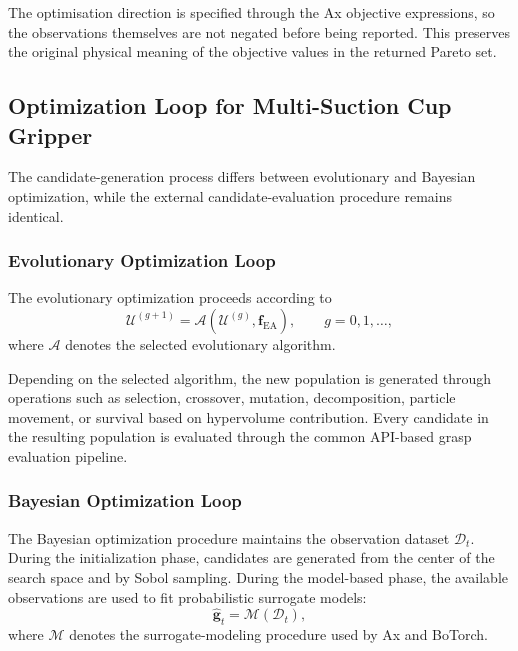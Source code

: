 The optimisation direction is specified through the Ax objective expressions, so the
observations themselves are not negated before being reported. This preserves the original
physical meaning of the objective values in the returned Pareto set.


\subsection{Optimization Loop for Multi-Suction Cup Gripper}

The candidate-generation process differs between evolutionary and Bayesian optimization, while the
external candidate-evaluation procedure remains identical.

\subsubsection{Evolutionary Optimization Loop}

The evolutionary optimization proceeds according to
\begin{equation}
    \mathcal{U}^{(g+1)}
    =
    \mathcal{A}
    \left(
        \mathcal{U}^{(g)},
        \mathbf{f}_{\mathrm{EA}}
    \right),
    \qquad
    g=0,1,\dots,
\end{equation}
where $\mathcal{A}$ denotes the selected evolutionary algorithm.

Depending on the selected algorithm, the new population is generated through operations such as
selection, crossover, mutation, decomposition, particle movement, or survival based on hypervolume
contribution. Every candidate in the resulting population is evaluated through the common API-based
grasp evaluation pipeline.

\subsubsection{Bayesian Optimization Loop}

The Bayesian optimization procedure maintains the observation dataset $\mathcal{D}_t$. During the
initialization phase, candidates are generated from the center of the search space and by Sobol
sampling. During the model-based phase, the available observations are used to fit probabilistic
surrogate models:
\begin{equation}
    \widehat{\mathbf{g}}_t
    =
    \mathcal{M}(\mathcal{D}_t),
\end{equation}
where $\mathcal{M}$ denotes the surrogate-modeling procedure used by Ax and BoTorch.

